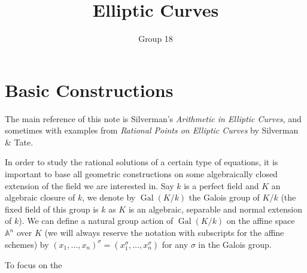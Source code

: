 \documentclass[12pt]{article}
\title{Elliptic Curves}
\author{Group 18}
\theoremstyle{remark}
\theoremstyle{definition}
\newcommand{\Gal}[0]{\operatorname{Gal}}
\begin{document}
    \maketitle
    \tableofcontents
    \newpage
	\section{Basic Constructions}
        The main reference of this note is Silverman's \textit{Arithmetic in Elliptic Curves}, and sometimes with examples from \textit{Rational Points on Elliptic Curves} by Silverman \& Tate.

        In order to study the rational solutions of a certain type of equations, it is important to base all geometric constructions on some algebraically closed extension of the field we are interested in. Say $k$ is a perfect field and $K$ an algebraic closure of $k$, we denote by $\Gal(K/k)$ the Galois group of $K/k$ (the fixed field of this group is $k$ as $K$ is an algebraic, separable and normal extension of $k$). We can define a natural group action of $\Gal(K/k)$ on the affine space $\mathbb A^n$ over $K$ (we will always reserve the notation with subscripts for the affine schemes) by $(x_1,\dots, x_n)^\sigma =(x_1^\sigma,\dots, x_n^\sigma)$ for any $\sigma$ in the Galois group.

        To focus on the 
\end{document}
